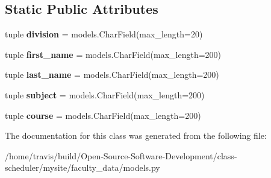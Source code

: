 \subsection*{Static Public Attributes}
\begin{DoxyCompactItemize}
\item 
\hypertarget{classfaculty__data_1_1models_1_1_faculty_a162057cc95e31e5f1db6cf628bcd9be7}{tuple {\bfseries division} = models.\-Char\-Field(max\-\_\-length=20)}\label{classfaculty__data_1_1models_1_1_faculty_a162057cc95e31e5f1db6cf628bcd9be7}

\item 
\hypertarget{classfaculty__data_1_1models_1_1_faculty_a5fefec5b0832df4ffcf413dd83a3280e}{tuple {\bfseries first\-\_\-name} = models.\-Char\-Field(max\-\_\-length=200)}\label{classfaculty__data_1_1models_1_1_faculty_a5fefec5b0832df4ffcf413dd83a3280e}

\item 
\hypertarget{classfaculty__data_1_1models_1_1_faculty_acb398c50a259ddfa78fb96193f0bc177}{tuple {\bfseries last\-\_\-name} = models.\-Char\-Field(max\-\_\-length=200)}\label{classfaculty__data_1_1models_1_1_faculty_acb398c50a259ddfa78fb96193f0bc177}

\item 
\hypertarget{classfaculty__data_1_1models_1_1_faculty_a31c54101010c9cae133a5ab312e30bbd}{tuple {\bfseries subject} = models.\-Char\-Field(max\-\_\-length=200)}\label{classfaculty__data_1_1models_1_1_faculty_a31c54101010c9cae133a5ab312e30bbd}

\item 
\hypertarget{classfaculty__data_1_1models_1_1_faculty_a34c4bea60edfec2bda42d5fdf984fad6}{tuple {\bfseries course} = models.\-Char\-Field(max\-\_\-length=200)}\label{classfaculty__data_1_1models_1_1_faculty_a34c4bea60edfec2bda42d5fdf984fad6}

\end{DoxyCompactItemize}


The documentation for this class was generated from the following file\-:\begin{DoxyCompactItemize}
\item 
/home/travis/build/\-Open-\/\-Source-\/\-Software-\/\-Development/class-\/scheduler/mysite/faculty\-\_\-data/models.\-py\end{DoxyCompactItemize}
